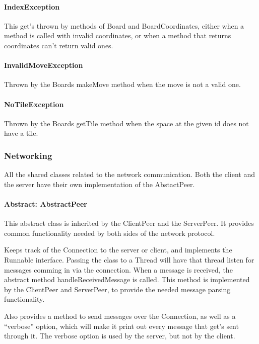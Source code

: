 \documentclass[12pt, letterpaper]{article}
\begin{document}
    \paragraph{IndexException}
    This get's thrown by methods of Board and BoardCoordinates, either when a method is called with invalid
    coordinates, or when a method that returns coordinates can't return valid ones.

    \paragraph{InvalidMoveException}
    Thrown by the Boards makeMove method when the move is not a valid one.

    \paragraph{NoTileException}
    Thrown by the Boards getTile method when the space at the given id does not have a tile.


    \subsubsection{Networking}

    All the shared classes related to the network communication.
    Both the client and the server have their own implementation of the AbstactPeer.

    \paragraph{Abstract: AbstractPeer}
    This abstract class is inherited by the ClientPeer and the ServerPeer.
    It provides common functionality needed by both sides of the network protocol.

    Keeps track of the Connection to the server or client, and implements the Runnable interface.
    Passing the class to a Thread will have that thread listen for messages comming in via the connection.
    When a message is received, the abstract method handleReceivedMessage is called.
    This method is implemented by the ClientPeer and ServerPeer, to provide the needed message parsing functionality.

    Also provides a method to send messages over the Connection, as well as a ``verbose'' option, which will make it
    print out every message that get's sent through it.
    The verbose option is used by the server, but not by the client.
\end{document}
